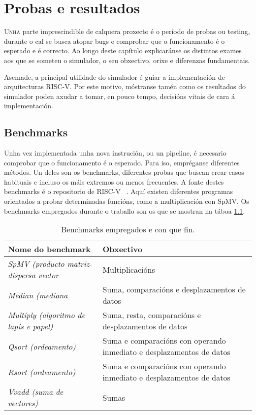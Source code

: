 \chapter{Probas e resultados}

\lettrine{U}{nha} parte imprescindible de calquera proxecto é o período de probas ou testing, durante o cal se busca atopar bugs e comprobar que o funcionamento é o esperado e é correcto. Ao longo deste capítulo explicaránse os distintos exames aos que se someteu o simulador, o seu obxectivo, orixe e diferenzas fundamentais.

Asemade, a principal utilidade do simulador é guiar a implementación de arquitecturas RISC-V. Por este motivo, móstranse tamén como os resultados do simulador poden axudar a tomar, en pouco tempo, decisións vitais de cara á implementación. 

\section{Benchmarks}\label{sec:benchmarks}
Unha vez implementada unha nova instrución, ou un pipeline, é necesario comprobar que o funcionamento é o esperado. Para iso, empréganse diferentes métodos. Un deles son os benchmarks, diferentes probas que buscan crear casos habituais e incluso os máis extremos ou menos frecuentes. A fonte destes benchmarks é o repositorio de RISC-V ~\cite{riscv_tests}. Aquí existen diferentes programas orientados a probar determinadas funcións, como a multiplicación con SpMV. Os benchmarks empregados durante o traballo son os que se mostran na táboa \ref{tab:benchmarks}.
\begin{table}[hp!]
  \centering
  \begin{tabular}{p{5cm}|p{8cm}}
    \rowcolor{udcpink!25}
    \textbf{Nome do benchmark} & \textbf{Obxectivo} \\\hline
    \textit{SpMV (producto matriz-dispersa vector} & Multiplicacións \\
    \textit{Median (mediana } & Suma, comparacións e desplazamentos de datos \\
    \textit{Multiply (algoritmo de lapis e papel)} & Suma, resta, comparacións e desplazamentos de datos \\
    \textit{Qsort (ordeamento)} & Suma e comparacións con operando inmediato e desplazamentos de datos \\
    \textit{Rsort (ordeamento)} & Suma e comparacións con operando inmediato e desplazamentos de datos \\
    \textit{Vvadd (suma de vectores)} & Sumas\\
  \end{tabular}
  \caption{Benchmarks empregados e con que fin.}
  \label{tab:benchmarks}
\end{table}

